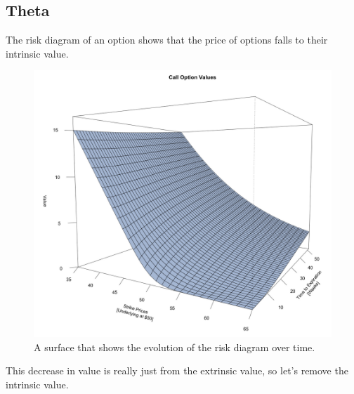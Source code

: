 \documentclass{article}
\begin{document}
  \subsection{Theta}

    The risk diagram of an option shows that the price of options falls to their intrinsic value. 

    \begin{figure}[H]
      \centering 
      \includegraphics[scale=0.4]{img/theta1.png}
      \caption{A surface that shows the evolution of the risk diagram over time. } 
      \label{fig:theta1}
    \end{figure}

    This decrease in value is really just from the extrinsic value, so let's remove the intrinsic value. 
\end{document}
